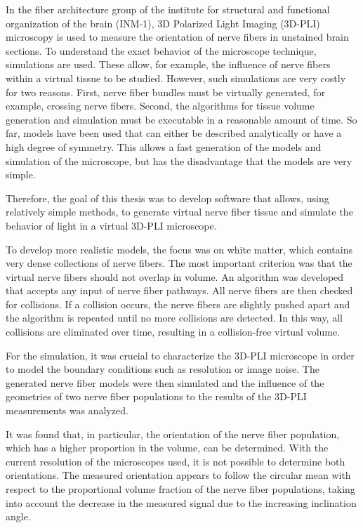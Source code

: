 %
In the fiber architecture group of the institute for structural and functional organization of the brain (INM-1), 3D Polarized Light Imaging (3D-PLI) microscopy is used to measure the orientation of nerve fibers in unstained brain sections.
To understand the exact behavior of the microscope technique, simulations are used.
These allow, for example, the influence of nerve fibers within a virtual tissue to be studied.
However, such simulations are very costly for two reasons.
First, nerve fiber bundles must be virtually generated, for example, crossing nerve fibers.
Second, the algorithms for tissue volume generation and simulation must be executable in a reasonable amount of time.
So far, models have been used that can either be described analytically or have a high degree of symmetry.
This allows a fast generation of the models and simulation of the microscope, but has the disadvantage that the models are very simple. 

Therefore, the goal of this thesis was to develop software that allows, using relatively simple methods, to generate virtual nerve fiber tissue and simulate the behavior of light in a virtual 3D-PLI microscope.

To develop more realistic models, the focus was on white matter, which contains very dense collections of nerve fibers.
The most important criterion was that the virtual nerve fibers should not overlap in volume.
An algorithm was developed that accepts any input of nerve fiber pathways.
All nerve fibers are then checked for collisions.
If a collision occurs, the nerve fibers are slightly pushed apart and the algorithm is repeated until no more collisions are detected.
In this way, all collisions are eliminated over time, resulting in a collision-free virtual volume.

For the simulation, it was crucial to characterize the 3D-PLI microscope in order to model the boundary conditions such as resolution or image noise.
The generated nerve fiber models were then simulated and the influence of the geometries of two nerve fiber populations to the results of the 3D-PLI measurements was analyzed.

It was found that, in particular, the orientation of the nerve fiber population, which has a higher proportion in the volume, can be determined.
With the current resolution of the microscopes used, it is not possible to determine both orientations.
The measured orientation appears to follow the circular mean with respect to the proportional volume fraction of the nerve fiber populations, taking into account the decrease in the measured signal due to the increasing inclination angle.

